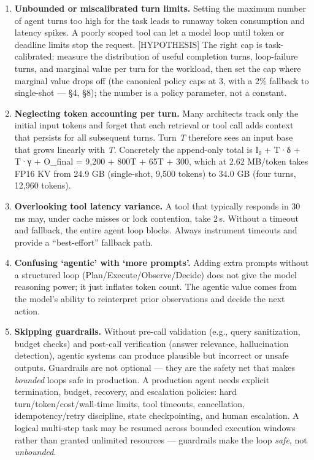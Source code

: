 \begin{enumerate}
\def\labelenumi{\arabic{enumi}.}
\item
  \textbf{Unbounded or miscalibrated turn limits.} Setting the maximum
  number of agent turns too high for the task leads to runaway token
  consumption and latency spikes. A poorly scoped tool can let a model
  loop until token or deadline limits stop the request. \mbox{{[}HYPOTHESIS{]}}
  The right cap is task-calibrated: measure the distribution of useful
  completion turns, loop-failure turns, and marginal value per turn for
  the workload, then set the cap where marginal value drops off (the
  canonical policy caps at 3, with a 2\% fallback to single-shot --- §4,
  §8); the number is a policy parameter, not a constant.
\item
  \textbf{Neglecting token accounting per turn.} Many architects track
  only the initial input tokens and forget that each retrieval or tool
  call adds context that persists for all subsequent turns. Turn
  \emph{T} therefore sees an input base that grows linearly with
  \emph{T}. Concretely the append-only total is I₀ + T·δ + T·γ +
  O\_final = 9,200 + 800T + 65T + 300, which at 2.62 MB/token takes FP16
  KV from 24.9 GB (single-shot, 9,500 tokens) to 34.0 GB (four turns,
  12,960 tokens).
\item
  \textbf{Overlooking tool latency variance.} A tool that typically
  responds in 30\,ms may, under cache misses or lock contention, take
  2\,s. Without a timeout and fallback, the entire agent loop blocks.
  Always instrument timeouts and provide a ``best-effort'' fallback
  path.
\item
  \textbf{Confusing `agentic' with `more prompts'.} Adding extra prompts
  without a structured loop (Plan/Execute/Observe/Decide) does not give
  the model reasoning power; it just inflates token count. The agentic
  value comes from the model's ability to reinterpret prior observations
  and decide the next action.
\item
  \textbf{Skipping guardrails.} Without pre-call validation (e.g., query
  sanitization, budget checks) and post-call verification (answer
  relevance, hallucination detection), agentic systems can produce
  plausible but incorrect or unsafe outputs. Guardrails are not optional
  --- they are the safety net that makes \emph{bounded} loops safe in
  production. A production agent needs explicit termination, budget,
  recovery, and escalation policies: hard turn/token/cost/wall-time
  limits, tool timeouts, cancellation, idempotency/retry discipline,
  state checkpointing, and human escalation. A logical multi-step task
  may be resumed across bounded execution windows rather than granted
  unlimited resources --- guardrails make the loop \emph{safe}, not
  \emph{unbounded}.
\end{enumerate}

